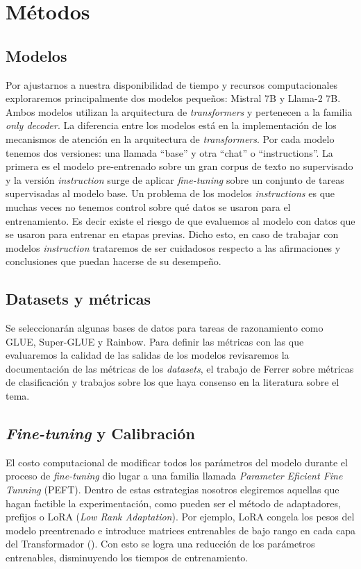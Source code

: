 \documentclass[a4paper,11pt,titlepage]{article}
\begin{document}
\section{Métodos}\label{sec3}

\subsection{Modelos}
Por ajustarnos a nuestra disponibilidad de tiempo y recursos computacionales exploraremos principalmente dos modelos pequeños: Mistral 7B y Llama-2 7B. Ambos modelos utilizan la arquitectura de \textit{transformers} y pertenecen a la familia \textit{only decoder}. La diferencia entre los modelos está en la implementación de los mecanismos de atención en la arquitectura de \textit{transformers}.
Por cada modelo tenemos dos versiones: una llamada “base” y otra “chat” o “instructions”. La primera es el modelo pre-entrenado sobre un gran corpus de texto no supervisado y la versión \textit{instruction} surge de aplicar \textit{fine-tuning} sobre un conjunto de tareas supervisadas al modelo base. 
Un problema de los modelos \textit{instructions} es que muchas veces no tenemos control sobre qué datos se usaron para el entrenamiento. Es decir existe el riesgo de que evaluemos al modelo con datos que se usaron para entrenar en etapas previas. Dicho esto, en caso de trabajar con modelos \textit{instruction} trataremos de ser cuidadosos respecto a las afirmaciones y conclusiones que puedan hacerse de su desempeño. 

\subsection{Datasets y métricas}\label{subsec2}
Se seleccionarán algunas bases de datos para tareas de razonamiento como GLUE, Super-GLUE y Rainbow. 
Para definir las métricas con las que evaluaremos la calidad de las salidas de los modelos revisaremos la documentación de las métricas de los \textit{datasets}, el trabajo de Ferrer sobre métricas de clasificación \cite{ferrer2023analysis}  y trabajos sobre los que haya consenso en la literatura sobre el tema. 

\subsection{\emph{Fine-tuning} y Calibración}\label{subsec2}
El costo computacional de modificar todos los parámetros del modelo durante el proceso de \textit{fine-tuning} dio lugar a una familia llamada \textit{Parameter Eficient Fine Tunning} (PEFT). Dentro de estas estrategias nosotros elegiremos aquellas que hagan factible la experimentación, como pueden ser el método de adaptadores, prefijos o LoRA (\emph{Low Rank Adaptation}). Por ejemplo, LoRA congela los pesos del modelo preentrenado e introduce matrices entrenables de bajo rango en cada capa del Transformador (\cite{hu2021lora}).  Con esto se logra una reducción de los parámetros entrenables, disminuyendo los tiempos de entrenamiento.
\end{document}
